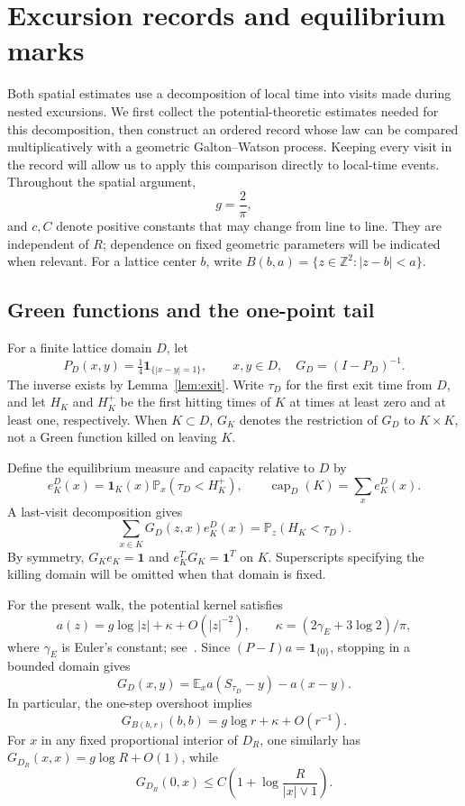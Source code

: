 \documentclass[11pt,letterpaper,reqno]{amsart}
\numberwithin{equation}{section}
\theoremstyle{remark}
\begin{document}
\section{Excursion records and equilibrium marks}\label{sec:records}
Both spatial estimates use a decomposition of local time into visits made during nested excursions. We first collect the potential-theoretic estimates needed for this decomposition, then construct an ordered record whose law can be compared multiplicatively with a geometric Galton--Watson process. Keeping every visit in the record will allow us to apply this comparison directly to local-time events. Throughout the spatial argument,
\[
g=\frac2\pi,
\]
and $c,C$ denote positive constants that may change from line to line. They are independent of $R$; dependence on fixed geometric parameters will be indicated when relevant. For a lattice center $b$, write $B(b,a)=\{z\in\mathbb Z^2:|z-b|<a\}$.

\subsection{Green functions and the one-point tail}\label{sec:green}
For a finite lattice domain $D$, let
\[
P_D(x,y)=\tfrac14\mathbf1_{\{|x-y|=1\}},\qquad x,y\in D,
\quad G_D=(I-P_D)^{-1}.
\]
The inverse exists by Lemma~\ref{lem:exit}. Write $\tau_D$ for the first exit time from $D$, and let $H_K$ and $H_K^+$ be the first hitting times of $K$ at times at least zero and at least one, respectively. When $K\subset D$, $G_K$ denotes the restriction of $G_D$ to $K\times K$, not a Green function killed on leaving $K$.

Define the equilibrium measure and capacity relative to $D$ by
\[
e_K^D(x)=\mathbf1_K(x)\mathbb P_x(\tau_D<H_K^+),\qquad
\operatorname{cap}_D(K)=\sum_x e_K^D(x).
\]
A last-visit decomposition gives
\begin{equation}\label{eq:2.4}
\sum_{x\in K}G_D(z,x)e_K^D(x)=\mathbb P_z(H_K<\tau_D).
\end{equation}
By symmetry, $G_Ke_K=\mathbf1$ and $e_K^TG_K=\mathbf1^T$ on $K$. Superscripts specifying the killing domain will be omitted when that domain is fixed.

For the present walk, the potential kernel satisfies
\begin{equation}\label{eq:2.5}
a(z)=g\log|z|+\kappa+O(|z|^{-2}),\qquad
\kappa=(2\gamma_E+3\log2)/\pi,
\end{equation}
where $\gamma_E$ is Euler's constant; see~\cite[Theorem 4.4.4]{LL}. Since $(P-I)a=\mathbf1_{\{0\}}$, stopping in a bounded domain gives
\begin{equation}\label{eq:2.6}
G_D(x,y)=\mathbb E_xa(S_{\tau_D}-y)-a(x-y).
\end{equation}
In particular, the one-step overshoot implies
\begin{equation}\label{eq:2.7}
G_{B(b,r)}(b,b)=g\log r+\kappa+O(r^{-1}).
\end{equation}
For $x$ in any fixed proportional interior of $D_R$, one similarly has $G_{D_R}(x,x)=g\log R+O(1)$, while
\begin{equation}\label{eq:2.8}
G_{D_R}(0,x)\le C\left(1+\log\frac R{|x|\vee1}\right).
\end{equation}
\end{document}
